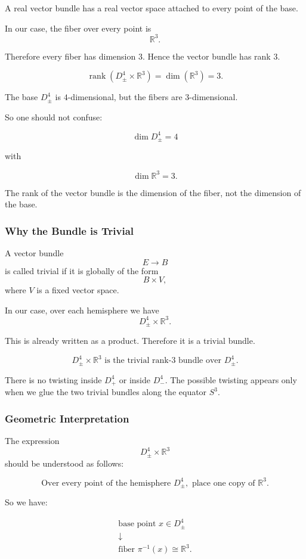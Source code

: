 \documentclass[12pt,a4paper]{article}
\theoremstyle{notespace}
\begin{document}
A real vector bundle has a real vector space attached to every point of the base.

In our case, the fiber over every point is
\[
\mathbb R^3.
\]

Therefore every fiber has dimension \(3\). Hence the vector bundle has rank \(3\).

\[
\boxed{
	\operatorname{rank}(D^4_\pm\times \mathbb R^3)
	=
	\dim(\mathbb R^3)
	=
	3.
}
\]

The base \(D^4_\pm\) is \(4\)-dimensional, but the fibers are \(3\)-dimensional.

So one should not confuse:

\[
\dim D^4_\pm=4
\]

with

\[
\dim \mathbb R^3=3.
\]

The rank of the vector bundle is the dimension of the fiber, not the dimension of the base.

\subsubsection{Why the Bundle is Trivial}

A vector bundle
\[
E\to B
\]
is called trivial if it is globally of the form
\[
B\times V,
\]
where \(V\) is a fixed vector space.

In our case, over each hemisphere we have
\[
D^4_\pm\times \mathbb R^3.
\]

This is already written as a product. Therefore it is a trivial bundle.

\[
\boxed{
	D^4_\pm\times \mathbb R^3
	\text{ is the trivial rank-}3\text{ bundle over }D^4_\pm.
}
\]

There is no twisting inside \(D^4_+\) or inside \(D^4_-\). The possible twisting appears only when we glue the two trivial bundles along the equator \(S^3\).

\subsubsection{Geometric Interpretation}

The expression
\[
D^4_\pm\times \mathbb R^3
\]
should be understood as follows:

\[
\boxed{
	\text{Over every point of the hemisphere }D^4_\pm,
	\text{ place one copy of }\mathbb R^3.
}
\]

So we have:

\[
\begin{array}{c}
	\text{base point }x\in D^4_\pm
	\\[1mm]
	\downarrow
	\\[1mm]
	\text{fiber }\pi^{-1}(x)\cong \mathbb R^3.
\end{array}
\]
\end{document}
